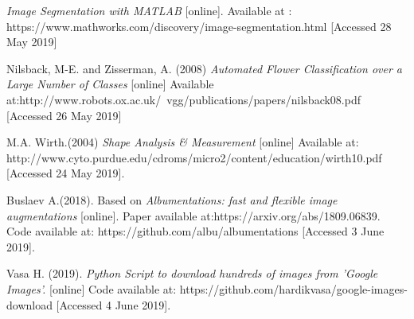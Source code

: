 \documentclass[11]{article}
\begin{document}
\newpage
\begin{thebibliography}{100}
\textit{Image Segmentation with MATLAB} [online]. Available at : https://www.mathworks.com/discovery/image-segmentation.html [Accessed 28 May 2019]

Nilsback, M-E. and Zisserman, A. (2008) \textit{Automated Flower Classification over a Large Number of Classes} [online] Available at:http://www.robots.ox.ac.uk/~vgg/publications/papers/nilsback08.pdf [Accessed 26 May 2019]


M.A. Wirth.(2004) \textit{Shape Analysis \& Measurement} [online] Available at: http://www.cyto.purdue.edu/cdroms/micro2/content/education/wirth10.pdf [Accessed 24 May 2019].

    Buslaev A.(2018). Based on \textit{Albumentations: fast and flexible image augmentations} [online]. Paper available at:https://arxiv.org/abs/1809.06839. Code available at: https://github.com/albu/albumentations  [Accessed 3 June 2019].


    Vasa H. (2019). \textit{Python Script to download hundreds of images from 'Google Images'.} [online] Code available at: https://github.com/hardikvasa/google-images-download [Accessed 4 June 2019].









\end{thebibliography}
\end{document}
